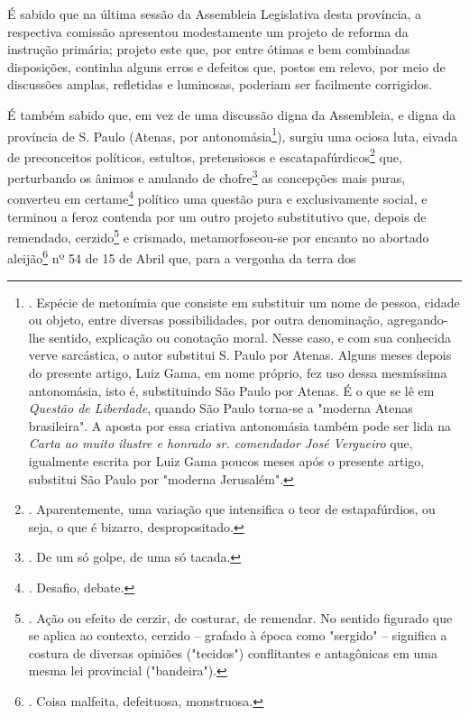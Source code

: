 É sabido que na última sessão da Assembleia Legislativa desta província,
a respectiva comissão apresentou modestamente um projeto de reforma da
instrução primária; projeto este que, por entre ótimas e bem combinadas
disposições, continha alguns erros e defeitos que, postos em relevo, por
meio de discussões amplas, refletidas e luminosas, poderiam ser
facilmente corrigidos.

É também sabido que, em vez de uma discussão digna da Assembleia, e
digna da província de S. Paulo (Atenas, por antonomásia\footnote{.
  Espécie de metonímia que consiste em substituir um nome de pessoa,
  cidade ou objeto, entre diversas possibilidades, por outra
  denominação, agregando-lhe sentido, explicação ou conotação moral.
  Nesse caso, e com sua conhecida verve sarcástica, o autor substitui S.
  Paulo por Atenas. Alguns meses depois do presente artigo, Luiz Gama,
  em nome próprio, fez uso dessa mesmíssima antonomásia, isto é,
  substituindo São Paulo por Atenas. É o que se lê em \emph{Questão de
  Liberdade}, quando São Paulo torna-se a "moderna Atenas brasileira". A
  aposta por essa criativa antonomásia também pode ser lida na
  \emph{Carta ao muito ilustre e honrado sr. comendador José Vergueiro}
  que, igualmente escrita por Luiz Gama poucos meses após o presente
  artigo, substitui São Paulo por "moderna Jerusalém".}), surgiu uma
ociosa luta, eivada de preconceitos políticos, estultos, pretensiosos e
escatapafúrdicos\footnote{. Aparentemente, uma variação que intensifica
  o teor de estapafúrdios, ou seja, o que é bizarro, despropositado.}
que, perturbando os ânimos e anulando de chofre\footnote{. De um só
  golpe, de uma só tacada.} as concepções mais puras, converteu em
certame\footnote{. Desafio, debate.} político uma questão pura e
exclusivamente social, e terminou a feroz contenda por um outro projeto
substitutivo que, depois de remendado, cerzido\footnote{. Ação ou efeito
  de cerzir, de costurar, de remendar. No sentido figurado que se aplica
  ao contexto, cerzido -- grafado à época como "sergido" -- significa a
  costura de diversas opiniões ("tecidos") conflitantes e antagônicas em
  uma mesma lei provincial ("bandeira").} e crismado, metamorfoseou-se
por encanto no abortado aleijão\footnote{. Coisa malfeita, defeituosa,
  monstruosa.} nº 54 de 15 de Abril que, para a vergonha da terra dos
